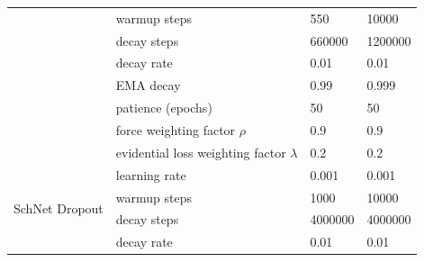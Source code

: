 \begin{tabular}{llll}
                                      & warmup steps                               & 550                                                      & 10000                                                   \\
                                      & decay steps                                & 660000                                                   & 1200000                                                 \\
                                      & decay rate                                 & 0.01                                                     & 0.01                                                    \\
                                      & EMA decay                                  & 0.99                                                     & 0.999                                                   \\
                                      & patience (epochs)                          & 50                                                       & 50                                                      \\
                                      & force weighting factor $\rho$              & 0.9                                                      & 0.9                                                     \\
                                      & evidential loss weighting factor $\lambda$ & 0.2                                                      & 0.2                                                     \\ \midrule
\multirow{8}{*}{SchNet Dropout}    & learning rate                              & 0.001                                                     & 0.001                                                    \\
                                   & warmup steps                               & 1000                                                      & 10000                                                    \\
                                   & decay steps                                & 4000000                                                   & 4000000                                                  \\
                                   & decay rate                                 & 0.01                                                      & 0.01                                                     \\

\end{tabular}
